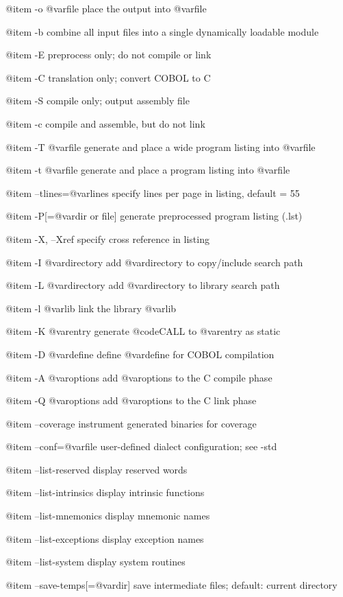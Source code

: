 @item -o @var{file}
place the output into @var{file}

@item -b
combine all input files into a single
dynamically loadable module

@item -E
preprocess only; do not compile or link

@item -C
translation only; convert COBOL to C

@item -S
compile only; output assembly file

@item -c
compile and assemble, but do not link

@item -T @var{file}
generate and place a wide program listing into @var{file}

@item -t @var{file}
generate and place a program listing into @var{file}

@item --tlines=@var{lines}
specify lines per page in listing, default = 55

@item -P[=@var{dir or file}]
generate preprocessed program listing (.lst)

@item -X, --Xref
specify cross reference in listing

@item -I @var{directory}
add @var{directory} to copy/include search path

@item -L @var{directory}
add @var{directory} to library search path

@item -l @var{lib}
link the library @var{lib}

@item -K @var{entry}
generate @code{CALL} to @var{entry} as static

@item -D @var{define}
define @var{define} for COBOL compilation

@item -A @var{options}
add @var{options} to the C compile phase

@item -Q @var{options}
add @var{options} to the C link phase

@item --coverage
instrument generated binaries for coverage

@item --conf=@var{file}
user-defined dialect configuration; see -std

@item --list-reserved
display reserved words

@item --list-intrinsics
display intrinsic functions

@item --list-mnemonics
display mnemonic names

@item --list-exceptions
display exception names

@item --list-system
display system routines

@item --save-temps[=@var{dir}]
save intermediate files; default: current directory


